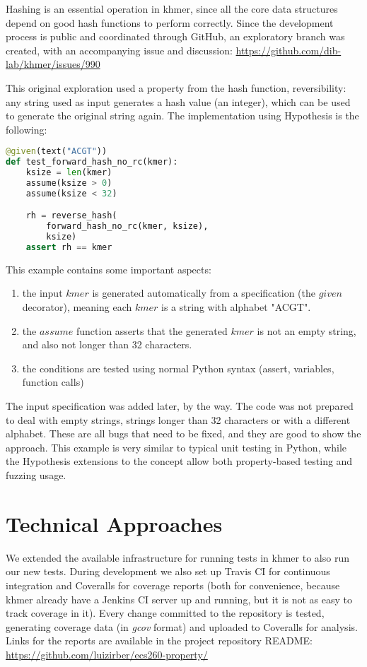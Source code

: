 \documentclass[preprint,nocopyrightspace]{sig-alternate}
\begin{document}
Hashing is an essential operation in khmer,
since all the core data structures depend on good hash functions to perform correctly.
Since the development process is public and coordinated through GitHub,
an exploratory branch was created,
with an accompanying issue and discussion:
\url{https://github.com/dib-lab/khmer/issues/990}

This original exploration used a property from the hash function,
reversibility:
any string used as input generates a hash value (an integer),
which can be used to generate the original string again.
The implementation using Hypothesis is the following:

\begin{lstlisting}[language=Python]
@given(text("ACGT"))
def test_forward_hash_no_rc(kmer):
    ksize = len(kmer)
    assume(ksize > 0)
    assume(ksize < 32)

    rh = reverse_hash(
        forward_hash_no_rc(kmer, ksize),
        ksize)
    assert rh == kmer
\end{lstlisting}

This example contains some important aspects:
\begin{enumerate}
\item the input $kmer$ is generated automatically from a specification (the $given$ decorator),
meaning each $kmer$ is a string with alphabet "ACGT".
\item the $assume$ function asserts that the generated $kmer$ is not an empty string,
and also not longer than 32 characters.
\item the conditions are tested using normal Python syntax (assert, variables, function calls)
\end{enumerate}

The input specification was added later,
by the way.
The code was not prepared to deal with empty strings,
strings longer than 32 characters or with a different alphabet.
These are all bugs that need to be fixed,
and they are good to show the approach.
This example is very similar to typical unit testing in Python,
while the Hypothesis extensions to the concept allow both property-based testing and fuzzing usage.

\section{Technical Approaches}

We extended the available infrastructure for running tests in khmer to also run our new tests.
During development we also set up Travis CI for continuous integration and Coveralls for coverage reports
(both for convenience,
because khmer already have a Jenkins CI server up and running,
but it is not as easy to track coverage in it).
Every change committed to the repository is tested,
generating coverage data (in \emph{gcov} format) and uploaded to Coveralls for analysis.
Links for the reports are available in the project repository README:
\url{https://github.com/luizirber/ecs260-property/}
\end{document}
